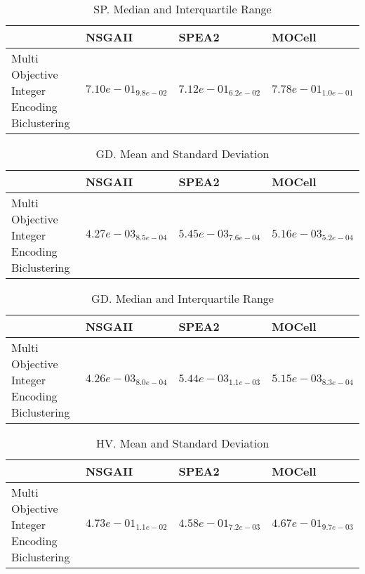 \documentclass{article}
\begin{document}
\begin{table}
\caption{SP. Median and Interquartile Range}
\label{table: SP}
\centering
\begin{scriptsize}
\begin{tabular}{llll}
\hline & NSGAII & SPEA2 &  MOCell\\
\hline 
Multi Objective Integer Encoding Biclustering & \cellcolor{gray95}$  7.10e-01_{ 9.8e-02}$ & \cellcolor{gray25}$  7.12e-01_{ 6.2e-02}$ & $  7.78e-01_{ 1.0e-01}$ \\
\hline
\end{tabular}
\end{scriptsize}
\end{table}

\begin{table}
\caption{GD. Mean and Standard Deviation}
\label{table: GD}
\centering
\begin{scriptsize}
\begin{tabular}{llll}
\hline & NSGAII & SPEA2 &  MOCell\\
\hline 
Multi Objective Integer Encoding Biclustering & \cellcolor{gray95}$  4.27e-03_{ 8.5e-04}$ & $  5.45e-03_{ 7.6e-04}$ & \cellcolor{gray25}$  5.16e-03_{ 5.2e-04}$ \\
\hline
\end{tabular}
\end{scriptsize}
\end{table}

\begin{table}
\caption{GD. Median and Interquartile Range}
\label{table: GD}
\centering
\begin{scriptsize}
\begin{tabular}{llll}
\hline & NSGAII & SPEA2 &  MOCell\\
\hline 
Multi Objective Integer Encoding Biclustering & \cellcolor{gray95}$  4.26e-03_{ 8.0e-04}$ & $  5.44e-03_{ 1.1e-03}$ & \cellcolor{gray25}$  5.15e-03_{ 8.3e-04}$ \\
\hline
\end{tabular}
\end{scriptsize}
\end{table}

\begin{table}
\caption{HV. Mean and Standard Deviation}
\label{table: HV}
\centering
\begin{scriptsize}
\begin{tabular}{llll}
\hline & NSGAII & SPEA2 &  MOCell\\
\hline 
Multi Objective Integer Encoding Biclustering & \cellcolor{gray95}$  4.73e-01_{ 1.1e-02}$ & $  4.58e-01_{ 7.2e-03}$ & \cellcolor{gray25}$  4.67e-01_{ 9.7e-03}$ \\
\hline
\end{tabular}
\end{scriptsize}
\end{table}
\end{document}
